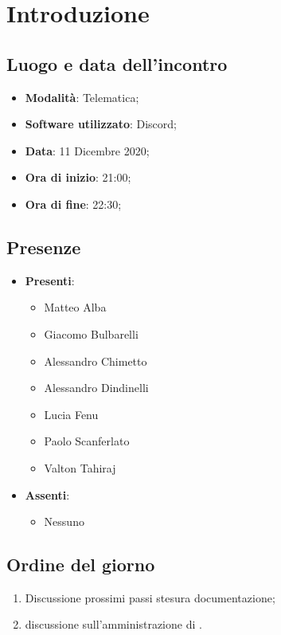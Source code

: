 \documentclass[]{article}
\begin{document}
	

	\newpage


	\section{Introduzione}
		\subsection{Luogo e data dell'incontro}
		\begin{itemize}
			\item \textbf{Modalità}: Telematica;
			\item \textbf{Software utilizzato}: Discord;
			\item \textbf{Data}: 11 Dicembre 2020;
			\item \textbf{Ora di inizio}: 21:00;
			\item \textbf{Ora di fine}: 22:30;
		\end{itemize}

		\subsection{Presenze}
		\begin{itemize}
			\item \textbf{Presenti}:
			\begin{itemize}
				\item Matteo Alba
				\item Giacomo Bulbarelli
				\item Alessandro Chimetto
				\item Alessandro Dindinelli
				\item Lucia Fenu
				\item Paolo Scanferlato
				\item Valton Tahiraj
			\end{itemize}
			\item \textbf{Assenti}:
			\begin{itemize}
				\item Nessuno
			\end{itemize}
		\end{itemize}


		\subsection{Ordine del giorno}
		\begin{enumerate}
			\item Discussione prossimi passi stesura documentazione;
			\item discussione sull'amministrazione di .
		\end{enumerate}
\end{document}
